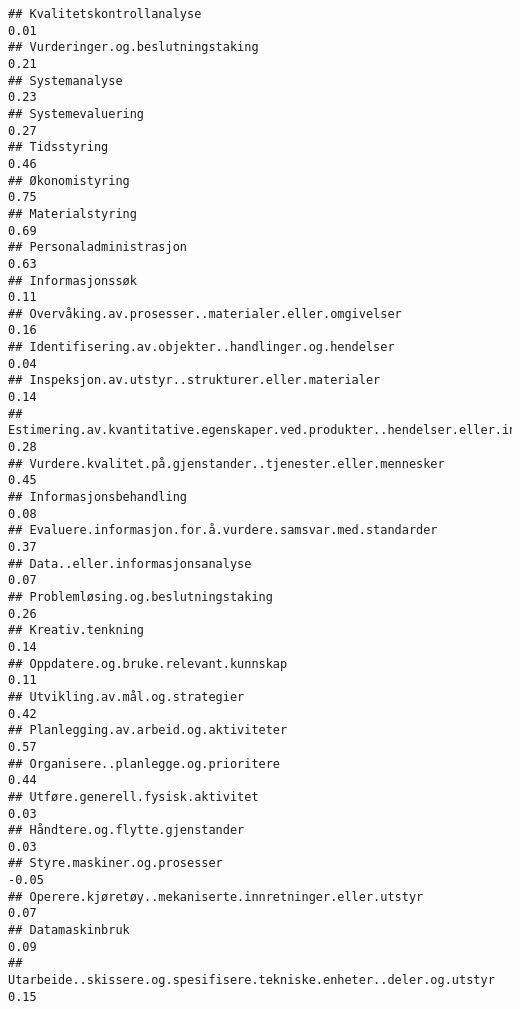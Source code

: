 \documentclass[
]{article}
\begin{document}
\begin{verbatim}
## Kvalitetskontrollanalyse                                                          0.01
## Vurderinger.og.beslutningstaking                                                  0.21
## Systemanalyse                                                                     0.23
## Systemevaluering                                                                  0.27
## Tidsstyring                                                                       0.46
## Økonomistyring                                                                    0.75
## Materialstyring                                                                   0.69
## Personaladministrasjon                                                            0.63
## Informasjonssøk                                                                   0.11
## Overvåking.av.prosesser..materialer.eller.omgivelser                              0.16
## Identifisering.av.objekter..handlinger.og.hendelser                               0.04
## Inspeksjon.av.utstyr..strukturer.eller.materialer                                 0.14
## Estimering.av.kvantitative.egenskaper.ved.produkter..hendelser.eller.informasjon  0.28
## Vurdere.kvalitet.på.gjenstander..tjenester.eller.mennesker                        0.45
## Informasjonsbehandling                                                            0.08
## Evaluere.informasjon.for.å.vurdere.samsvar.med.standarder                         0.37
## Data..eller.informasjonsanalyse                                                   0.07
## Problemløsing.og.beslutningstaking                                                0.26
## Kreativ.tenkning                                                                  0.14
## Oppdatere.og.bruke.relevant.kunnskap                                              0.11
## Utvikling.av.mål.og.strategier                                                    0.42
## Planlegging.av.arbeid.og.aktiviteter                                              0.57
## Organisere..planlegge.og.prioritere                                               0.44
## Utføre.generell.fysisk.aktivitet                                                  0.03
## Håndtere.og.flytte.gjenstander                                                    0.03
## Styre.maskiner.og.prosesser                                                      -0.05
## Operere.kjøretøy..mekaniserte.innretninger.eller.utstyr                           0.07
## Datamaskinbruk                                                                    0.09
## Utarbeide..skissere.og.spesifisere.tekniske.enheter..deler.og.utstyr              0.15

\end{verbatim}
\end{document}

